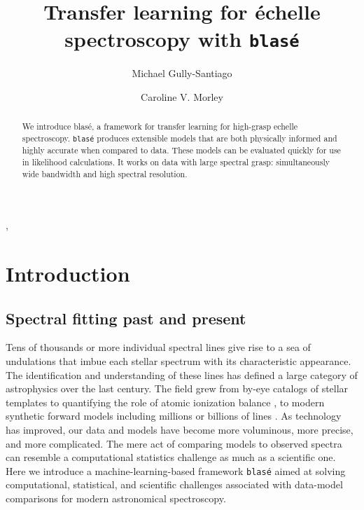 \documentclass[modern]{aastex631}
\begin{document}
\title{Transfer learning for \'echelle spectroscopy with \texttt{blas\'e}}

\author{Michael Gully-Santiago}

\author{Caroline V. Morley}

\begin{abstract}

    We introduce blas\'e, a framework for transfer learning for high-grasp echelle spectroscopy.  \texttt{blas\'e} produces extensible models that are both physically informed and highly accurate when compared to data. These models can be evaluated quickly for use in likelihood calculations. It works on data with large spectral grasp: simultaneously wide bandwidth and high spectral resolution.


\end{abstract}

,

\section{Introduction}\label{sec:intro}

\subsection{Spectral fitting past and present}

Tens of thousands or more individual spectral lines give rise to a sea of undulations that imbue each stellar spectrum with its characteristic appearance.  The identification and understanding of these lines has defined a large category of astrophysics over the last century.  The field grew from by-eye catalogs of stellar templates \citep{1901AnHar..28..129C} to quantifying the role of atomic ionization balance \citep{1925PhDT.........1P}, to modern synthetic forward models including millions or billions of lines \citep{husser13, 2021ApJ...920...85M}.  As technology has improved, our data and models have become more voluminous, more precise, and more complicated.  The mere act of comparing models to observed spectra can resemble a computational statistics challenge as much as a scientific one.  Here we introduce a machine-learning-based framework \texttt{blas\'e} aimed at solving computational, statistical, and scientific challenges associated with data-model comparisons for modern astronomical spectroscopy.
\end{document}
